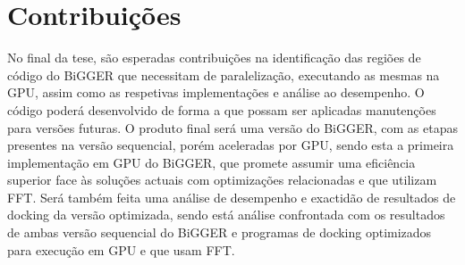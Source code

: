  \section{Contribuições}
%
%
%
No final da tese, são esperadas contribuições na identificação das regiões de código do BiGGER que necessitam de paralelização, executando as mesmas na GPU, assim como as respetivas implementações e análise ao desempenho. O código poderá desenvolvido de forma a que possam ser aplicadas manutenções para versões futuras. O produto final será uma versão do BiGGER, com as etapas presentes na versão sequencial, porém aceleradas por GPU, sendo esta a primeira implementação em GPU do BiGGER, que promete assumir uma eficiência superior face às soluções actuais com optimizações relacionadas e que utilizam FFT.
Será também feita uma análise de desempenho e exactidão de resultados de docking da versão optimizada, sendo está análise confrontada com os resultados de ambas versão sequencial do BiGGER e programas de docking optimizados para execução em GPU e que usam FFT.

